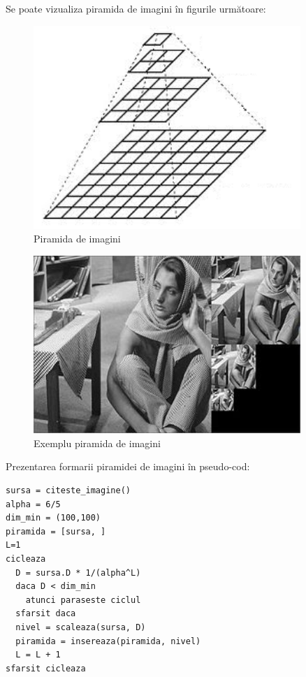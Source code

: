 Se poate vizualiza piramida de imagini în figurile următoare:

\begin{figure}[H]
	\centering
		\includegraphics[width=0.90\textwidth]{imagini/Pyramids_Tutorial_Pyramid_Theory.png}
	\caption{Piramida de imagini}
	\label{fig:Pyramids_Tutorial_Pyramid_Theory}
\end{figure}

\begin{figure}[H]
	\centering
		\includegraphics[width=0.90\textwidth]{imagini/300px-Example_pyramid.jpg}
	\caption{Exemplu piramida de imagini}
	\label{fig:300px-Example_pyramid}
\end{figure}


Prezentarea formarii piramidei de imagini în pseudo-cod:
\begin{mdframed}
\begin{verbatim}
sursa = citeste_imagine()
alpha = 6/5
dim_min = (100,100)
piramida = [sursa, ]
L=1
cicleaza
  D = sursa.D * 1/(alpha^L)
  daca D < dim_min
    atunci paraseste ciclul
  sfarsit daca
  nivel = scaleaza(sursa, D)
  piramida = insereaza(piramida, nivel)
  L = L + 1
sfarsit cicleaza
\end{verbatim}
\end{mdframed}

